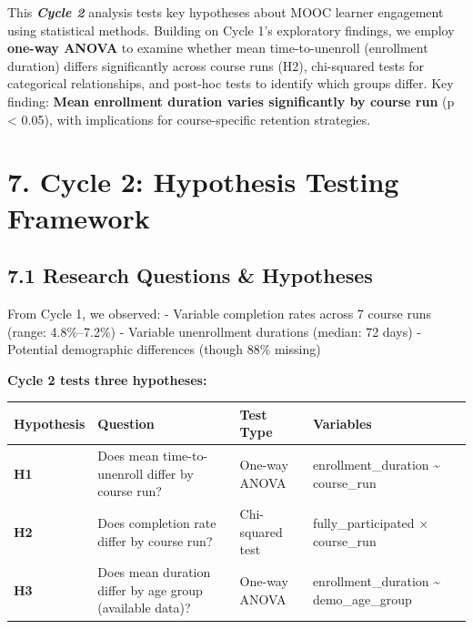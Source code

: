 \documentclass[
]{article}
\newcounter{none} %
\begin{document}
This \textbf{\emph{Cycle 2}} analysis tests key hypotheses about MOOC
learner engagement using statistical methods. Building on Cycle 1's
exploratory findings, we employ \textbf{one-way ANOVA} to examine
whether mean time-to-unenroll (enrollment duration) differs
significantly across course runs (H2), chi-squared tests for categorical
relationships, and post-hoc tests to identify which groups differ. Key
finding: \textbf{Mean enrollment duration varies significantly by course
run} (p \textless{} 0.05), with implications for course-specific
retention strategies.

\section{7. Cycle 2: Hypothesis Testing
Framework}\label{cycle-2-hypothesis-testing-framework}

\subsection{7.1 Research Questions \&
Hypotheses}\label{research-questions-hypotheses}

From Cycle 1, we observed: - Variable completion rates across 7 course
runs (range: 4.8\%--7.2\%) - Variable unenrollment durations (median: 72
days) - Potential demographic differences (though 88\% missing)

\textbf{Cycle 2 tests three hypotheses:}

{\def\LTcaptype{none} %
\begin{longtable}[]{@{}
  >{\raggedright\arraybackslash}p{}
  >{\raggedright\arraybackslash}p{}
  >{\raggedright\arraybackslash}p{}
  >{\raggedright\arraybackslash}p{}@{}}
\toprule\noalign{}
\begin{minipage}[b]{\linewidth}\raggedright
Hypothesis
\end{minipage} & \begin{minipage}[b]{\linewidth}\raggedright
Question
\end{minipage} & \begin{minipage}[b]{\linewidth}\raggedright
Test Type
\end{minipage} & \begin{minipage}[b]{\linewidth}\raggedright
Variables
\end{minipage} \\
\midrule\noalign{}
\endhead
\bottomrule\noalign{}
\endlastfoot
\textbf{H1} & Does mean time-to-unenroll differ by course run? & One-way
ANOVA & enrollment\_duration \textasciitilde{} course\_run \\
\textbf{H2} & Does completion rate differ by course run? & Chi-squared
test & fully\_participated × course\_run \\
\textbf{H3} & Does mean duration differ by age group (available data)? &
One-way ANOVA & enrollment\_duration \textasciitilde{}
demo\_age\_group \\
\end{longtable}
}
\end{document}
